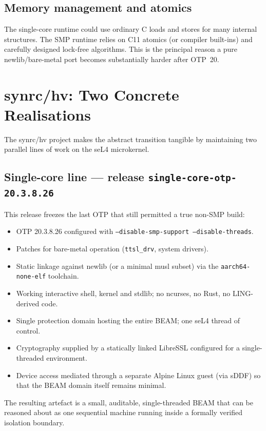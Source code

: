 \documentclass{article}
\begin{document}
\subsection{Memory management and atomics}

The single-core runtime could use ordinary C loads and stores for many internal structures.
The SMP runtime relies on C11 atomics (or compiler built-ins) and carefully designed lock-free algorithms.
This is the principal reason a pure newlib/bare-metal port becomes substantially harder after OTP~20.

\newpage
\section{synrc/hv: Two Concrete Realisations}

The synrc/hv project makes the abstract transition tangible by maintaining two parallel lines of work on the seL4 microkernel.

\subsection{Single-core line --- release \texttt{single-core-otp-20.3.8.26}}

This release freezes the last OTP that still permitted a true non-SMP build:

\begin{itemize}
  \item OTP 20.3.8.26 configured with \texttt{--disable-smp-support --disable-threads}.
  \item Patches for bare-metal operation (\texttt{ttsl\_drv}, system drivers).
  \item Static linkage against newlib (or a minimal musl subset) via the \texttt{aarch64-none-elf} toolchain.
  \item Working interactive shell, kernel and stdlib; no ncurses, no Rust, no LING-derived code.
  \item Single protection domain hosting the entire BEAM; one seL4 thread of control.
  \item Cryptography supplied by a statically linked LibreSSL configured for a single-threaded environment.
  \item Device access mediated through a separate Alpine Linux guest (via sDDF) so that the BEAM domain itself remains minimal.
\end{itemize}

The resulting artefact is a small, auditable, single-threaded BEAM that can be reasoned about as one sequential machine running inside a formally verified isolation boundary.
\end{document}
